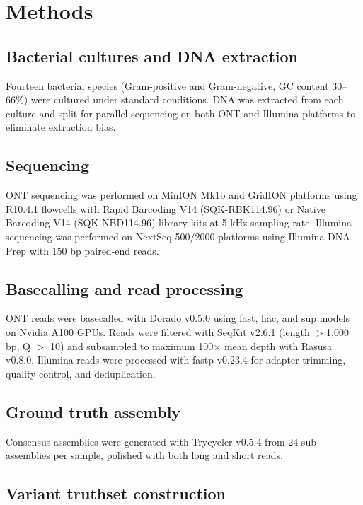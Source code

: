 \documentclass[11pt]{article}
\begin{document}
\section{Methods}

\subsection{Bacterial cultures and DNA extraction}

Fourteen bacterial species (Gram-positive and Gram-negative, GC content 30--66\%) were cultured under standard conditions. DNA was extracted from each culture and split for parallel sequencing on both ONT and Illumina platforms to eliminate extraction bias.

\subsection{Sequencing}

ONT sequencing was performed on MinION Mk1b and GridION platforms using R10.4.1 flowcells with Rapid Barcoding V14 (SQK-RBK114.96) or Native Barcoding V14 (SQK-NBD114.96) library kits at 5 kHz sampling rate. Illumina sequencing was performed on NextSeq 500/2000 platforms using Illumina DNA Prep with 150 bp paired-end reads.

\subsection{Basecalling and read processing}

ONT reads were basecalled with Dorado v0.5.0 using fast, hac, and sup models on Nvidia A100 GPUs. Reads were filtered with SeqKit v2.6.1 (length $>$1,000 bp, Q $>$ 10) and subsampled to maximum 100$\times$ mean depth with Rasusa v0.8.0. Illumina reads were processed with fastp v0.23.4 for adapter trimming, quality control, and deduplication.

\subsection{Ground truth assembly}

Consensus assemblies were generated with Trycycler v0.5.4 from 24 sub-assemblies per sample, polished with both long and short reads.

\subsection{Variant truthset construction}
\end{document}
